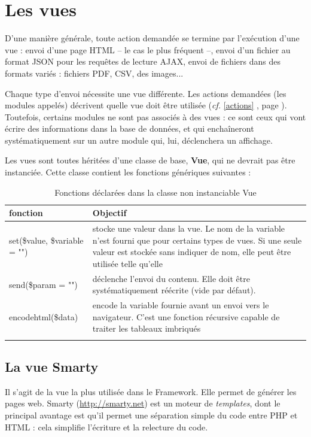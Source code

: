\chapter{Les vues}\label{vue}

D'une manière générale, toute action demandée se termine par l'exécution d'une vue : envoi d'une page HTML -- le cas le plus fréquent --, envoi d'un fichier au format JSON pour les requêtes de lecture AJAX, envoi de fichiers dans des formats variés : fichiers PDF, CSV, des images...

Chaque type d'envoi nécessite une vue différente. Les actions demandées (les modules appelés) décrivent quelle vue doit être utilisée (\textit{cf.} \ref{actions} \textit{}, page \pageref{actions}). Toutefois, certains modules ne sont pas associés à des vues : ce sont ceux qui vont écrire des informations dans la base de données, et qui enchaîneront systématiquement sur un autre module qui, lui, déclenchera un affichage.

Les vues sont toutes héritées d'une classe de base, \textbf{Vue}, qui ne devrait pas être instanciée. Cette classe contient les fonctions génériques suivantes :

\begin{longtable}{|p{5cm}|p{8cm}|}
\hline
\textbf{fonction} & \textbf{Objectif} \\
\hline
\endhead

set(\$value, \$variable = "") & stocke une valeur dans la vue. Le nom de la variable n'est fourni que pour certains types de vues. Si une seule valeur est stockée sans indiquer de nom, elle peut être utilisée telle qu'elle \\
\hline
send(\$param = "") & déclenche l'envoi du contenu. Elle doit être systématiquement réécrite (vide par défaut). \\
\hline
encodehtml(\$data) & encode la variable fournie avant un envoi vers le navigateur. C'est une fonction récursive capable de traiter les tableaux imbriqués \\
\hline

\caption{Fonctions déclarées dans la classe non instanciable Vue}
\end{longtable}

\section{La vue Smarty}

Il s'agit de la vue la plus utilisée dans le Framework. Elle permet de générer les pages web. Smarty (\url{http://smarty.net}) est un moteur de \textit{templates}, dont le principal avantage est qu'il permet une séparation simple du code entre PHP et HTML : cela simplifie l'écriture et la relecture du code.

